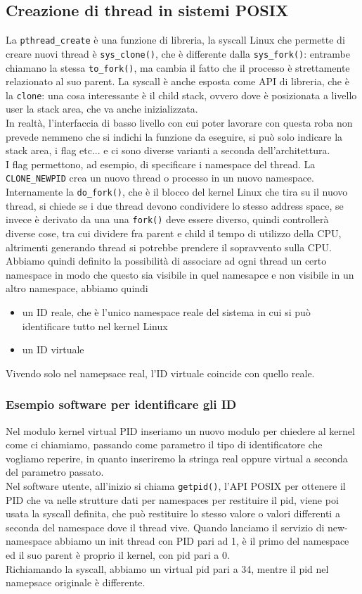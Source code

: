 \documentclass[12pt, oneside]{extbook}
\begin{document}
\subsection{Creazione di thread in sistemi POSIX}
La \texttt{pthread\_create} è una funzione di libreria, la syscall Linux che permette di creare nuovi thread è \texttt{sys\_clone()}, che è differente dalla \texttt{sys\_fork()}: entrambe chiamano la stessa \texttt{to\_fork()}, ma cambia il fatto che il processo è strettamente relazionato al suo parent. La syscall è anche esposta come API di libreria, che è la \texttt{clone}: una cosa interessante è il child stack, ovvero dove è posizionata a livello user la stack area, che va anche inizializzata.\\In realtà, l'interfaccia di basso livello con cui poter lavorare con questa roba non prevede nemmeno che si indichi la funzione da eseguire, si può solo indicare la stack area, i flag etc... e ci sono diverse varianti a seconda dell'architettura.\\ I flag permettono, ad esempio, di specificare i namespace del thread. La \texttt{CLONE\_NEWPID} crea un nuovo thread o processo in un nuovo namespace.\\Internamente la \texttt{do\_fork()}, che è il blocco del kernel Linux che tira su il nuovo thread, si chiede se i due thread devono condividere lo stesso address space, se invece è derivato da una una \texttt{fork()} deve essere diverso, quindi controllerà diverse cose, tra cui dividere fra parent e child il tempo di utilizzo della CPU, altrimenti generando thread si potrebbe prendere il sopravvento sulla CPU. Abbiamo quindi definito la possibilità di associare ad ogni thread un certo namespace in modo che questo sia visibile in quel namesapce e non visibile in un altro namespace, abbiamo quindi 
\begin{itemize}
\item un ID reale, che è l'unico namespace reale del sistema in cui si può identificare tutto nel kernel Linux
\item un ID virtuale
\end{itemize}
Vivendo solo nel namepsace real, l'ID virtuale coincide con quello reale.
\subsubsection{Esempio software per identificare gli ID}
Nel modulo kernel virtual PID inseriamo un nuovo modulo per chiedere al kernel come ci chiamiamo, passando come parametro il tipo di identificatore che vogliamo reperire, in quanto inseriremo la stringa real oppure virtual a seconda del parametro passato.\\Nel software utente, all'inizio si chiama \texttt{getpid()}, l'API POSIX per ottenere il PID che va nelle strutture dati per namespaces per restituire il pid, viene poi usata la syscall definita, che può restituire lo stesso valore o valori differenti a seconda del namespace dove il thread vive. Quando lanciamo il servizio di new-namespace abbiamo un init thread con PID pari ad 1, è il primo del namespace ed il suo parent è proprio il kernel, con pid pari a 0.\\Richiamando la syscall, abbiamo un virtual pid pari a 34, mentre il pid nel namepsace originale è differente.
\end{document}
